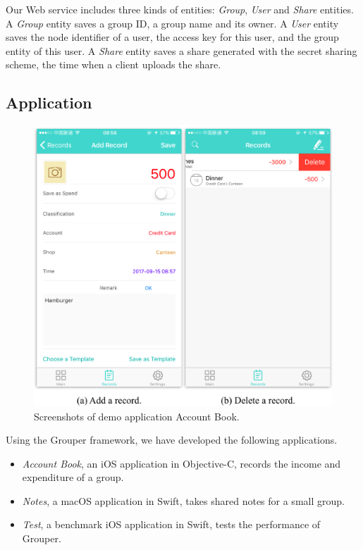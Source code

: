 \documentclass[twocolumn,10pt]{article}
\begin{document}
Our Web service includes three kinds of entities: \emph{Group}, \emph{User} and \emph{Share} entities. 
A \emph{Group} entity saves a group ID, a group name and its owner. 
A \emph{User} entity saves the node identifier of a user, the access key for this user, and the group entity of this user. 
A \emph{Share} entity saves a share generated with the secret sharing scheme, the time when a client uploads the share. 

\subsection{Application}

\begin{figure}[t]
	\centering
	\includegraphics[scale=0.5]{account_book}
	\caption{Screenshots of demo application Account Book.}
\end{figure}

Using the Grouper framework, we have developed the following applications. 

\begin{itemize}
	\setlength{\itemsep}{1pt}
	\setlength{\parskip}{0pt}
	\setlength{\parsep}{0pt}
	\item \emph{Account Book}, an iOS application in Objective-C, records the income and expenditure of a group.
	\item \emph{Notes}, a macOS application in Swift, takes shared notes for a small group.
	\item \emph{Test}, a benchmark iOS application in Swift, tests the performance of Grouper.
\end{itemize}
\end{document}
